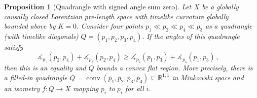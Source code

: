 \documentclass[11pt,reqno]{amsart}
\theoremstyle{definition}
\theoremstyle{definition}
\theoremstyle{plain}
\newtheorem{pop}[dfn]{Proposition}
\theoremstyle{remark}
\newcommand{\R}{\mathbb R}
\newcommand{\LpLS}{Lorentzian pre-length space }
\newcommand{\ma}{\measuredangle}
\DeclareMathOperator{\conv}{conv}
\begin{document}
\begin{pop}[Quadrangle with signed angle sum zero]\label{pop:quadrangle rigidity}
Let $X$ be a globally causally closed \LpLS with timelike curvature globally bounded above by $K=0$. Consider four points $p_1\ll p_2\ll p_4\ll p_3$ as a quadrangle (with timelike diagonals) $Q=(p_1,p_2,p_3,p_4)$. If the angles of this quadrangle satisfy
\begin{equation}\label{eq:quadranglerigidity}
\ma_{p_1}(p_2,p_4) + \ma_{p_3}(p_2,p_4) \geq \ma_{p_2}(p_1,p_3) + \ma_{p_4}(p_1,p_3) \,,
\end{equation}
then this is an equality and $Q$ bounds a convex flat region. More precisely, there is a filled-in quadrangle $\bar Q=\conv(\bar p_1,\bar p_2,\bar p_3,\bar p_4)\subseteq\R^{1,1}$ in Minkowski space and an isometry $f:\bar Q\to X$ mapping $\bar p_i$ to $p_i$ for all $i$.
\end{pop}
\end{document}
